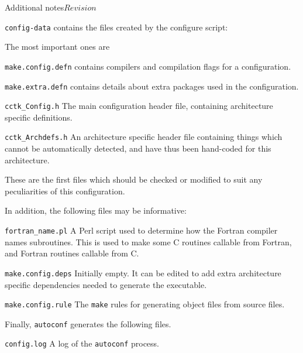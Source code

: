 \begin{cactuspart}{Additional notes}{}{$Revision$}
\begin{Lentry}

\item [\texttt{config-data}] contains the files created by the configure
script:

The most important ones are

\begin{Lentry}

\item [\texttt{make.config.defn}]
contains compilers and compilation flags for a configuration.

\item [\texttt{make.extra.defn}]
contains details about extra packages used in the configuration.

\item [\texttt{cctk\_Config.h}]
The main configuration header file, containing architecture specific
definitions.

\item [\texttt{cctk\_Archdefs.h}]
An architecture specific header file containing things which cannot be
automatically detected, and have thus been hand-coded for this architecture.
\end{Lentry}

These are the first files which should be checked or modified to suit any
peculiarities of this configuration.

In addition, the following files may be informative:

\begin{Lentry}
\item [\texttt{fortran\_name.pl}]
A Perl script used to determine how the Fortran compiler names subroutines.
This is used to make some C routines callable from Fortran, and Fortran
routines callable from C.

\item [\texttt{make.config.deps}]
Initially empty.  It can be edited to add extra architecture specific dependencies
needed to generate the executable.

\item [\texttt{make.config.rule}]
The \texttt{make} rules for generating object files from source files.

\end{Lentry}

Finally, \texttt{autoconf} generates the following files.

\begin{Lentry}

\item [\texttt{config.log}]
A log of the \texttt{autoconf} process.


\end{Lentry}
\end{Lentry}
\end{cactuspart}
